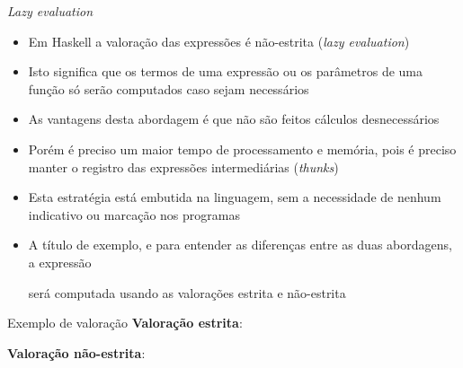 \begin{frame}[fragile]{\it Lazy evaluation}

    \begin{itemize}
        \item Em Haskell a valoração das expressões é não-estrita (\textit{lazy evaluation})

        \item Isto significa que os termos de uma expressão ou os parâmetros de uma função
            só serão computados caso sejam necessários

        \item As vantagens desta abordagem é que não são feitos cálculos desnecessários

        \item Porém é preciso um maior tempo de processamento e memória, pois é preciso manter
            o registro das expressões intermediárias (\textit{thunks})

        \item Esta estratégia está embutida na linguagem, sem a necessidade de nenhum indicativo
            ou marcação nos programas

        \item A título de exemplo, e para entender as diferenças entre as duas abordagens, a 
        expressão


        será computada usando as valorações estrita e não-estrita
    \end{itemize}

\end{frame}

\begin{frame}[fragile]{Exemplo de valoração}
    \textbf{Valoração estrita}:
    \vspace{0.1in}

    \vspace{0.3in}

    \textbf{Valoração não-estrita}:
    \vspace{0.1in}
\end{frame}

